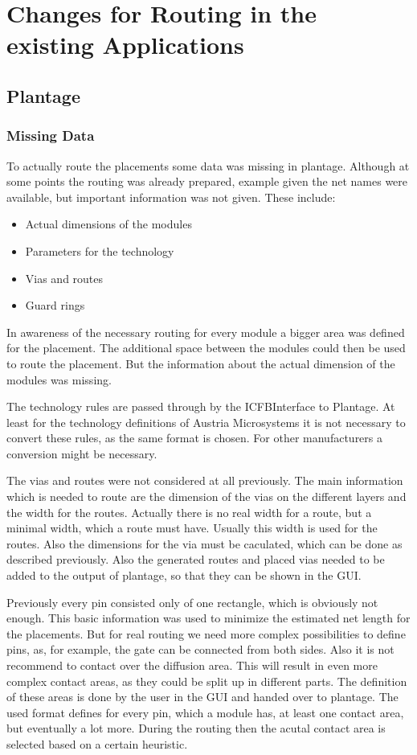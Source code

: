 \section{Changes for Routing in the existing Applications}

\subsection{Plantage}

\subsubsection{Missing Data}
To actually route the placements some data was missing in plantage. Although at some points the routing was already prepared, example given the net names were available, but important information was not given. These include:
\begin{itemize}
\item Actual dimensions of the modules
\item Parameters for the technology
\item Vias and routes
\item Guard rings
\end{itemize}

In awareness of the necessary routing for every module a bigger area was defined for the placement. The additional space between the modules could then be used to route the placement. But the information about the actual dimension of the modules was missing.

The technology rules are passed through by the ICFBInterface to Plantage. At least for the technology definitions of Austria Microsystems it is not necessary to convert these rules, as the same format is chosen. For other manufacturers a conversion might be necessary.

The vias and routes were not considered at all previously. The main information which is needed to route are the dimension of the vias on the different layers and the width for the routes. Actually there is no real width for a route, but a minimal width, which a route must have. Usually this width is used for the routes. Also the dimensions for the via must be caculated, which can be done as described previously. Also the generated routes and placed vias needed to be added to the output of plantage, so that they can be shown in the GUI.

Previously every pin consisted only of one rectangle, which is obviously not enough. This basic information was used to minimize the estimated net length for the placements. But for real routing we need more complex possibilities to define pins, as, for example, the gate can be connected from both sides. Also it is not recommend to contact over the diffusion area. This will result in even more complex contact areas, as they could be split up in different parts. The definition of these areas is done by the user in the GUI and handed over to plantage. The used format defines for every pin, which a module has, at least one contact area, but eventually a lot more. During the routing then the acutal contact area is selected based on a certain heuristic.

